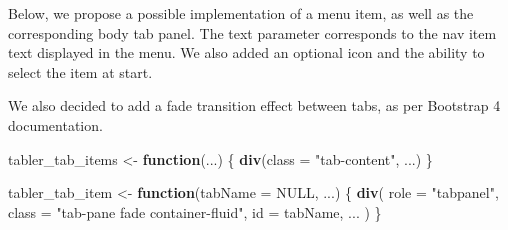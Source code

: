 \documentclass[
]{book}
\newenvironment{Shaded}{\begin{snugshade}}{\end{snugshade}}
\newcommand{\CommentTok}[1]{\textcolor[rgb]{0.56,0.35,0.01}{\textit{#1}}}
\newcommand{\ControlFlowTok}[1]{\textcolor[rgb]{0.13,0.29,0.53}{\textbf{#1}}}
\newcommand{\DataTypeTok}[1]{\textcolor[rgb]{0.13,0.29,0.53}{#1}}
\newcommand{\KeywordTok}[1]{\textcolor[rgb]{0.13,0.29,0.53}{\textbf{#1}}}
\newcommand{\NormalTok}[1]{#1}
\newcommand{\OperatorTok}[1]{\textcolor[rgb]{0.81,0.36,0.00}{\textbf{#1}}}
\newcommand{\OtherTok}[1]{\textcolor[rgb]{0.56,0.35,0.01}{#1}}
\newcommand{\StringTok}[1]{\textcolor[rgb]{0.31,0.60,0.02}{#1}}
\begin{document}
Below, we propose a possible implementation of a menu item, as well as the corresponding body tab panel. The text parameter corresponds to the nav item text displayed in the menu. We also added an optional icon and the ability to select the item at start.

\begin{Shaded}
\end{Shaded}

We also decided to add a fade transition effect between tabs, as per Bootstrap 4 documentation.

\begin{Shaded}
\begin{Highlighting}[]
\NormalTok{tabler_tab_items <-}\StringTok{ }\ControlFlowTok{function}\NormalTok{(...) \{}
  \KeywordTok{div}\NormalTok{(}\DataTypeTok{class =} \StringTok{"tab-content"}\NormalTok{, ...)}
\NormalTok{\}}

\NormalTok{tabler_tab_item <-}\StringTok{ }\ControlFlowTok{function}\NormalTok{(}\DataTypeTok{tabName =} \OtherTok{NULL}\NormalTok{, ...) \{}
  \KeywordTok{div}\NormalTok{(}
    \DataTypeTok{role =} \StringTok{"tabpanel"}\NormalTok{,}
    \DataTypeTok{class =} \StringTok{"tab-pane fade container-fluid"}\NormalTok{,}
    \DataTypeTok{id =}\NormalTok{ tabName,}
\NormalTok{    ...}
\NormalTok{  )}
\NormalTok{\}}
\end{Highlighting}
\end{Shaded}
\end{document}
